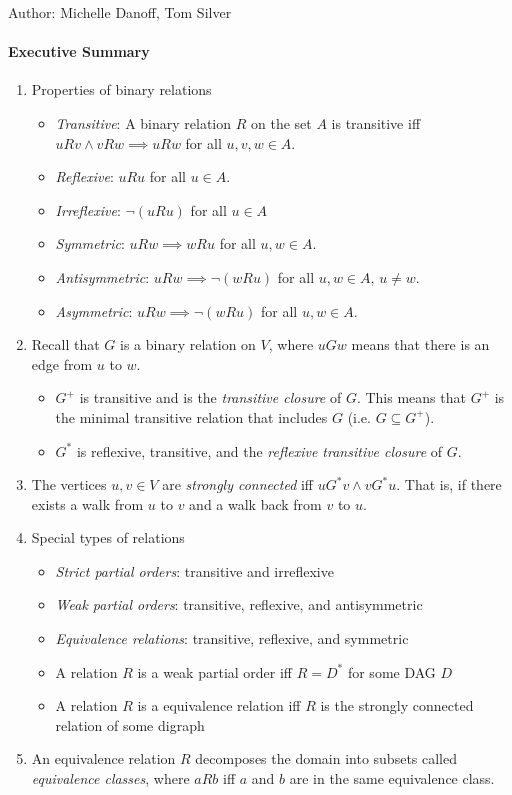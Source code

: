 \documentclass[solution, letterpaper]{cs20inclass}
\begin{document}

\noindent Author: Michelle Danoff, Tom Silver%

\paragraph*{Executive Summary}
\begin{enumerate}
\item Properties of binary relations
\begin{itemize}
\item \textit{Transitive}: A binary relation $R$ on the set $A$ is transitive iff\\$u R v \wedge v R w \implies u R w$ for all $u,v,w \in A$.
\item \textit{Reflexive}: $u R u$ for all $u \in A$.
\item \textit{Irreflexive}: $\neg(uRu)$ for all $u \in A$
\item \textit{Symmetric}: $u R w \implies w R u$ for all $u,w \in A$.
\item \textit{Antisymmetric}: $u R w \implies \neg(wRu)$ for all $u, w \in A$, $u \neq w$.
\item \textit{Asymmetric}: $u R w \implies \neg(wRu)$ for all $u, w \in A$.
\end{itemize}
\item Recall that $G$ is a binary relation on $V$, where $uGw$ means that there is an edge from $u$ to $w$.
\begin{itemize}
\item $G^+$ is transitive and is the \textit{transitive closure} of $G$. This means that $G^+$ is the minimal transitive relation that includes $G$ (i.e. $G \subseteq G^+$).
\item $G^*$ is reflexive, transitive, and the \textit{reflexive transitive closure} of $G$.
\end{itemize}
\item The vertices $u,v \in V$ are \textit{strongly connected} iff $uG^*v \wedge vG^*u$. That is, if there exists a walk from $u$ to $v$ and a walk back from $v$ to $u$.
\item Special types of relations
\begin{itemize}
\item \textit{Strict partial orders}: transitive and irreflexive
\item \textit{Weak partial orders}: transitive, reflexive, and antisymmetric
\item \textit{Equivalence relations}: transitive, reflexive, and symmetric
\item A relation $R$ is a weak partial order iff $R = D^*$ for some DAG $D$
\item A relation $R$ is a equivalence relation iff $R$ is the strongly connected relation of some digraph
\end{itemize}
\item An equivalence relation $R$ decomposes the domain into subsets called \textit{equivalence classes}, where $aRb$ iff $a$ and $b$ are in the same equivalence class.
\end{enumerate}
\end{document}
